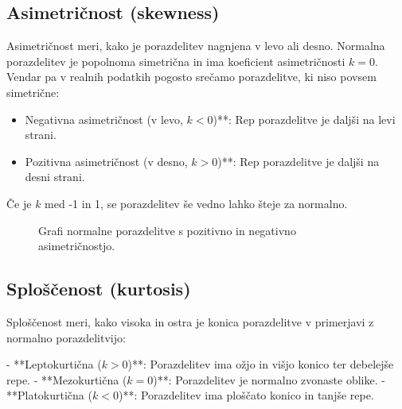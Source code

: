 \subsection{Asimetričnost (skewness)}

Asimetričnost meri, kako je porazdelitev nagnjena v levo ali desno. Normalna porazdelitev je popolnoma simetrična in ima koeficient asimetričnosti $k = 0$. Vendar pa v realnih podatkih pogosto srečamo porazdelitve, ki niso povsem simetrične:

\begin{itemize}
    \item Negativna asimetričnost (v levo, $k < 0$)**: Rep porazdelitve je daljši na levi strani.
    \item Pozitivna asimetričnost (v desno, $k > 0$)**: Rep porazdelitve je daljši na desni strani.
\end{itemize}

Če je $k$ med -1 in 1, se porazdelitev še vedno lahko šteje za normalno.

\begin{figure}
\centering
{}
\caption{Grafi normalne porazdelitve s pozitivno in negativno asimetričnostjo.}
\end{figure}

\subsection{Sploščenost (kurtosis)}

Sploščenost meri, kako visoka in ostra je konica porazdelitve v primerjavi z normalno porazdelitvijo:

- **Leptokurtična ($k > 0$)**: Porazdelitev ima ožjo in višjo konico ter debelejše repe.
- **Mezokurtična ($k = 0$)**: Porazdelitev je normalno zvonaste oblike.
- **Platokurtična ($k < 0$)**: Porazdelitev ima ploščato konico in tanjše repe.

